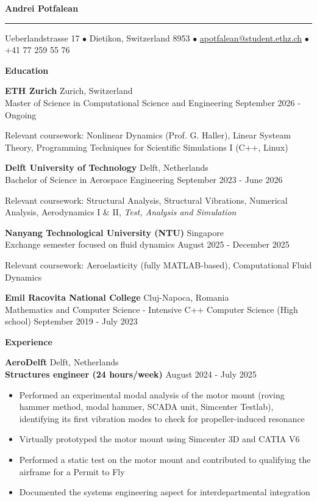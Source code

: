 \documentclass[11pt]{article}
\newcommand{\cvsection}[1]{%
  \vspace{16pt}%
  \centerline{\textbf{#1}}%
  \vspace{8pt}%
}
\newcommand{\cventry}[4]{%
  \textbf{#1} \hfill #2 \\
  #3 \hfill #4\par
}
\newcommand{\cvrole}[4]{%
  \textbf{#1} \hfill #2 \\
  \textbf{#3} \hfill #4\par
}
\newcommand{\cvgap}{\vspace{0.7em}}
\begin{document}
\begin{center}
  {\LARGE\textbf{Andrei Potfalean}}
\end{center}
\vspace{0.8pt}
\hrule
\vspace{18pt}
\centerline{Ueberlandstrasse 17 $\bullet$ Dietikon, Switzerland 8953 $\bullet$
  \href{mailto:apotfalean@student.ethz.ch}{apotfalean@student.ethz.ch} $\bullet$ +41 77 259 55 76}

\cvsection{Education}

\cventry{ETH Zurich}{Zurich, Switzerland}
  {Master of Science in Computational Science and Engineering}{September 2026 - Ongoing}
Relevant coursework: Nonlinear Dynamics (Prof. G. Haller), Linear Systeam Theory, Programming Techniques for Scientific Simulations I (C++, Linux)
\cvgap

\cventry{Delft University of Technology}{Delft, Netherlands}
  {Bachelor of Science in Aerospace Engineering}{September 2023 - June 2026}
Relevant coursework: Structural Analysis, Structural Vibrations, Numerical Analysis, Aerodynamics I \& II, \textit{Test, Analysis and Simulation}
\cvgap

\cventry{Nanyang Technological University (NTU)}{Singapore}
  {Exchange semester focused on fluid dynamics}{August 2025 - December 2025}
Relevant coursework: Aeroelasticity (fully MATLAB-based), Computational Fluid Dynamics
\cvgap

\cventry{Emil Racovita National College}{Cluj-Napoca, Romania}
  {Mathematics and Computer Science - Intensive C++ Computer Science (High school)}{September 2019 - July 2023}

\cvsection{Experience}

\cvrole{AeroDelft}{Delft, Netherlands}{Structures engineer (24 hours/week)}{August 2024 - July 2025}
\begin{itemize}
  \item Performed an experimental modal analysis of the motor mount (roving hammer method, modal hammer, SCADA unit, Simcenter Testlab), identifying its first vibration modes to check for propeller-induced resonance
  \item Virtually prototyped the motor mount using Simcenter 3D and CATIA V6
  \item Performed a static test on the motor mount and contributed to qualifying the airframe for a Permit to Fly
  \item Documented the systems engineering aspect for interdepartmental integration
\end{itemize}
\cvgap
\end{document}
